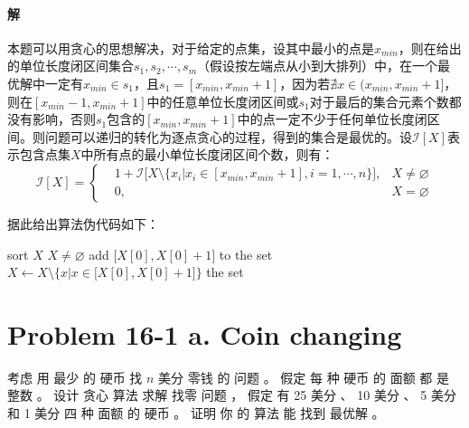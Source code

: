 \documentclass{article}
\begin{document}
\paragraph{解}
本题可以用贪心的思想解决，对于给定的点集，设其中最小的点是$x_{min}$，则在给出的单位长度闭区间集合${s_1,s_2,\cdots,s_m}$（假设按左端点从小到大排列）中，在一个最优解中一定有$x_{min} \in s_1$，且$s_1 = [x_{min}, x_{min} + 1]$，因为若$\nexists x \in (x_{min}, x_{min} + 1]$，则在$[x_{min} - 1, x_{min} + 1]$中的任意单位长度闭区间或$s_1$对于最后的集合元素个数都没有影响，否则$s_1$包含的$[x_{min}, x_{min} + 1]$中的点一定不少于任何单位长度闭区间。则问题可以递归的转化为逐点贪心的过程，得到的集合是最优的。设$\mathcal{I}[X]$表示包含点集$X$中所有点的最小单位长度闭区间个数，则有：
\begin{equation}
	\mathcal{I}[X] =
	\left\{
	\begin{aligned}
		&1 + \mathcal{I}\Big[X \setminus \big\{ x_i | x_i \in [x_{min}, x_{min} + 1], i = 1, \cdots ,n \big\} \Big], &X \neq \varnothing \\
		&0, &X = \varnothing
	\end{aligned}
	\right.
\end{equation}
\par
据此给出算法伪代码如下：
\begin{codebox}
	\li sort $X$
	\li \While $X \neq \varnothing$
		\Do
	\li 	add $\big[ X[0], X[0] + 1 \big]$ to the set
	\li		$X \gets X \setminus \Big\{ x|x \in \big[X[0], X[0] + 1 \big] \Big\}$
		\End
	\li \Return the set
\end{codebox}

\section{Problem 16-1 a. Coin changing }
考虑 用 最少 的 硬币 找 $n$ 美分 零钱 的 问题 。 假定 每 种 硬币 的 面额 都 是 整数 。 设计 贪心 算法 求解 找零 问题 ， 假定 有 25 美分 、 10 美分 、 5 美分 和 1 美分 四 种 面额 的 硬币 。 证明 你 的 算法 能 找到 最优解 。
\end{document}
